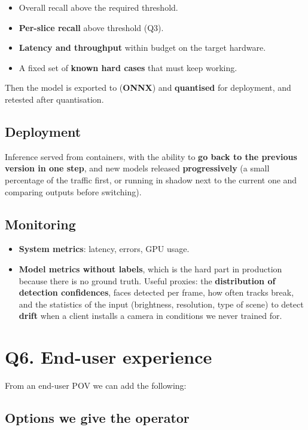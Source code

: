 \documentclass[11pt,a4paper]{article}
\begin{document}
\begin{itemize}
  \item Overall recall above the required threshold.
  \item \textbf{Per-slice recall} above threshold (Q3).
  \item \textbf{Latency and throughput} within budget on the target hardware.
  \item A fixed set of \textbf{known hard cases} that must keep working.
\end{itemize}

Then the model is exported to (\textbf{ONNX}) and \textbf{quantised} for
deployment, and retested after quantisation.

\subsection*{Deployment}

Inference served from containers, with the ability to \textbf{go back to the previous
version in one step}, and new models released \textbf{progressively} (a small percentage of the
traffic first, or running in shadow next to the current one and comparing outputs before
switching). 

\subsection*{Monitoring}

\begin{itemize}
  \item \textbf{System metrics}: latency, errors, GPU usage.
  \item \textbf{Model metrics without labels}, which is the hard part in production because
    there is no ground truth. Useful proxies: the \textbf{distribution of detection
    confidences}, faces detected per frame, how often tracks break, and the statistics of the
    input (brightness, resolution, type of scene) to detect \textbf{drift} when a client
    installs a camera in conditions we never trained for.
\end{itemize}

\section*{Q6. End-user experience}

From an end-user POV we can add the following:

\subsection*{Options we give the operator}
\end{document}

